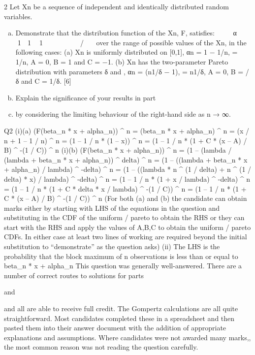 \documentclass[a4paper,12pt]{article}
\begin{document}


2 Let Xn be a sequence of independent and identically distributed random variables.

\begin{enumerate}[(a)]
\item Demonstrate that the distribution function of the Xn, F, satisfies:
􀵫𝐹􁈺\beta􀯡𝑥 􀵅 α􀯡􁈻􀵯􀯡 􀵌 􁉆1 􀵆
1
𝑛
􀵬1 􀵅
𝐶􁈺𝑥 􀵆 𝐴􁈻
𝐵
􀵰
􀬿􀬵/􀮼
􁉇
􀯡
over the range of possible values of the Xn, in the following cases:
(a) Xn is uniformly distributed on [0,1], αn = 1 − 1/n, \betan = 1/n, A = 0, B = 1
and C = −1.
(b) Xn has the two-parameter Pareto distribution with parameters δ and \lambda,
αn = \lambda(n1/δ − 1), \betan = n1/δ, A = 0, B = \lambda/δ and C = 1/δ.
[6]
\item Explain the significance of your results in part \item by considering the limiting
behaviour of the right-hand side as n → ∞. 

\end{enumerate}

\newpage


Q2
(i)(a)
(F(beta_n * x + alpha_n)) ^ n
= (beta_n * x + alpha_n) ^ n 
= (x / n + 1 – 1 / n) ^ n 
= (1 – 1 / n * (1 – x)) ^ n 
= (1 – 1 / n * (1 + C * (x – A) / B) ^ -(1 / C)) ^ n 
(i)(b)
(F(beta_n * x + alpha_n)) ^ n
= (1 – (lambda / (lambda + beta_n * x + alpha_n)) ^ delta) ^ n 
= (1 – ((lambda + beta_n * x + alpha_n) / lambda) ^ -delta) ^ n 
= (1 – ((lambda * n ^ (1 / delta) + n ^ (1 / delta) * x) / lambda) ^ -delta) ^ n 
= (1 – 1 / n * (1 + x / lambda) ^ -delta) ^ n 
= (1 – 1 / n * (1 + C * delta * x / lambda) ^ -(1 / C)) ^ n 
= (1 – 1 / n * (1 + C * (x – A) / B) ^ -(1 / C)) ^ n 
(For both (a) and (b) the candidate can obtain marks either by starting with LHS of the equations in the question and substituting in the CDF of the uniform / pareto to obtain the RHS or they can start with the RHS and apply the values of A,B,C to obtain the uniform / pareto CDFs. In either case at least two lines of working are required beyond the initial substitution to “demonstrate” as the question asks)
(ii)
The LHS is the probability that the block maximum of n observations is less than or equal to beta_n * x + alpha_n 
This question was generally well-answered.
There are a number of correct routes to solutions for parts \item and \item and all are able to receive full credit. 
The Gompertz calculations are all quite straightforward. Most candidates completed these in a spreadsheet and then pasted them into their answer document with the addition of appropriate explanations and assumptions.
Where candidates were not awarded many marks,, the most common reason was not reading the question carefully.
\newline
\end{document}

